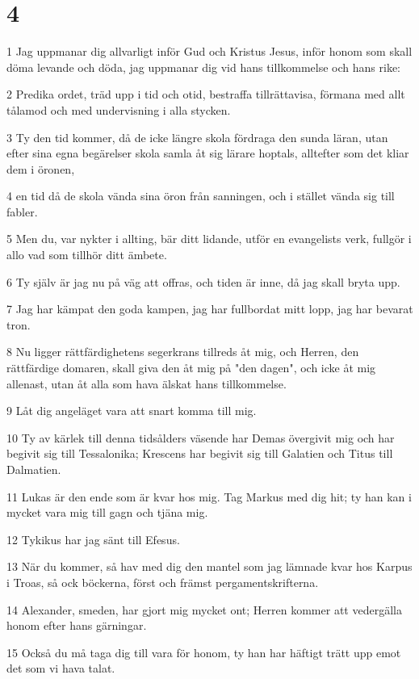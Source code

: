 \chapter{4}

\par 1 Jag uppmanar dig allvarligt inför Gud och Kristus Jesus, inför honom som skall döma levande och döda, jag uppmanar dig vid hans tillkommelse och hans rike:
\par 2 Predika ordet, träd upp i tid och otid, bestraffa tillrättavisa, förmana med allt tålamod och med undervisning i alla stycken.
\par 3 Ty den tid kommer, då de icke längre skola fördraga den sunda läran, utan efter sina egna begärelser skola samla åt sig lärare hoptals, alltefter som det kliar dem i öronen,
\par 4 en tid då de skola vända sina öron från sanningen, och i stället vända sig till fabler.
\par 5 Men du, var nykter i allting, bär ditt lidande, utför en evangelists verk, fullgör i allo vad som tillhör ditt ämbete.
\par 6 Ty själv är jag nu på väg att offras, och tiden är inne, då jag skall bryta upp.
\par 7 Jag har kämpat den goda kampen, jag har fullbordat mitt lopp, jag har bevarat tron.
\par 8 Nu ligger rättfärdighetens segerkrans tillreds åt mig, och Herren, den rättfärdige domaren, skall giva den åt mig på "den dagen", och icke åt mig allenast, utan åt alla som hava älskat hans tillkommelse.
\par 9 Låt dig angeläget vara att snart komma till mig.
\par 10 Ty av kärlek till denna tidsålders väsende har Demas övergivit mig och har begivit sig till Tessalonika; Krescens har begivit sig till Galatien och Titus till Dalmatien.
\par 11 Lukas är den ende som är kvar hos mig. Tag Markus med dig hit; ty han kan i mycket vara mig till gagn och tjäna mig.
\par 12 Tykikus har jag sänt till Efesus.
\par 13 När du kommer, så hav med dig den mantel som jag lämnade kvar hos Karpus i Troas, så ock böckerna, först och främst pergamentskrifterna.
\par 14 Alexander, smeden, har gjort mig mycket ont; Herren kommer att vedergälla honom efter hans gärningar.
\par 15 Också du må taga dig till vara för honom, ty han har häftigt trätt upp emot det som vi hava talat.
